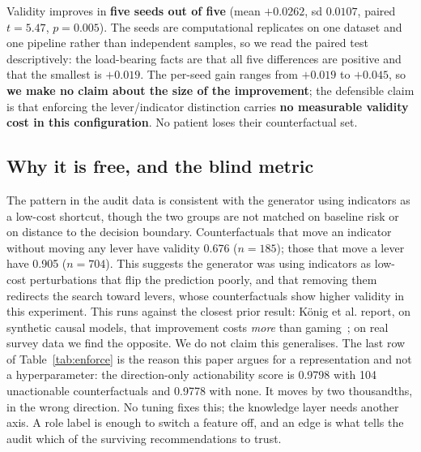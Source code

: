 \documentclass[conference]{IEEEtran}
\begin{document}
Validity improves in \textbf{five seeds out of five} (mean $+0.0262$, sd $0.0107$, paired $t=5.47$, $p=0.005$). The seeds are computational replicates on one dataset and one pipeline rather than independent samples, so we read the paired test descriptively: the load-bearing facts are that all five differences are positive and that the smallest is $+0.019$. The per-seed gain ranges from $+0.019$ to $+0.045$, so \textbf{we make no claim about the size of the improvement}; the defensible claim is that enforcing the lever/indicator distinction carries \textbf{no measurable validity cost in this configuration}. No patient loses their counterfactual set.

\subsection{Why it is free, and the blind metric}
The pattern in the audit data is consistent with the generator using indicators as a low-cost shortcut, though the two groups are not matched on baseline risk or on distance to the decision boundary. Counterfactuals that move an indicator without moving any lever have validity 0.676 ($n=185$); those that move a lever have 0.905 ($n=704$). This suggests the generator was using indicators as low-cost perturbations that flip the prediction poorly, and that removing them redirects the search toward levers, whose counterfactuals show higher validity in this experiment. This runs against the closest prior result: K\"onig et al. report, on synthetic causal models, that improvement costs \emph{more} than gaming~\cite{konig2023}; on real survey data we find the opposite. We do not claim this generalises. The last row of Table~\ref{tab:enforce} is the reason this paper argues for a representation and not a hyperparameter: the direction-only actionability score is 0.9798 with 104 unactionable counterfactuals and 0.9778 with none. It moves by two thousandths, in the wrong direction. No tuning fixes this; the knowledge layer needs another axis. A role label is enough to switch a feature off, and an edge is what tells the audit which of the surviving recommendations to trust.
\end{document}
